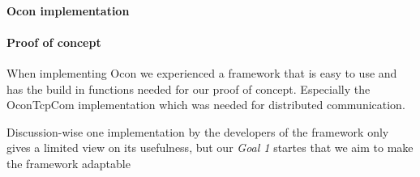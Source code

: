 \documentclass[../report.tex]{subfiles}
\begin{document}
\graphicspath{{img/}{../img/}}


\paragraph{Ocon implementation}




\paragraph{Proof of concept}
When implementing Ocon we experienced a framework that is easy to use and has the build in functions needed for our proof of concept. Especially the OconTcpCom implementation which was needed for distributed communication.

Discussion-wise one implementation by the developers of the framework only gives a limited view on its usefulness, but our \textit{Goal 1} startes that we aim to make the framework adaptable
\end{document}
